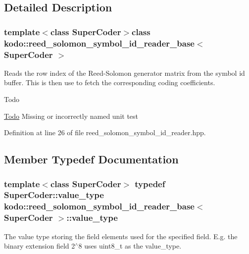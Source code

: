 \subsection{Detailed Description}
\subsubsection*{template$<$class Super\-Coder$>$class kodo\-::reed\-\_\-solomon\-\_\-symbol\-\_\-id\-\_\-reader\-\_\-base$<$ Super\-Coder $>$}

Reads the row index of the Reed-\/\-Solomon generator matrix from the symbol id buffer. This is then use to fetch the corresponding coding coefficients. 

\begin{DoxyRefDesc}{Todo}
\item[\hyperlink{todo__todo000045}{Todo}]Missing or incorrectly named unit test\end{DoxyRefDesc}


Definition at line 26 of file reed\-\_\-solomon\-\_\-symbol\-\_\-id\-\_\-reader.\-hpp.



\subsection{Member Typedef Documentation}
\hypertarget{classkodo_1_1reed__solomon__symbol__id__reader__base_aae5efe4cddfb83d9a895a95f44572d83}{
\subsubsection[{value\-\_\-type}]{\setlength{\rightskip}{0pt plus 5cm}template$<$class Super\-Coder$>$ typedef Super\-Coder\-::value\-\_\-type {\bf kodo\-::reed\-\_\-solomon\-\_\-symbol\-\_\-id\-\_\-reader\-\_\-base}$<$ Super\-Coder $>$\-::{\bf value\-\_\-type}}}\label{classkodo_1_1reed__solomon__symbol__id__reader__base_aae5efe4cddfb83d9a895a95f44572d83}




The value type storing the field elements used for the specified field. E.\-g. the binary extension field 2$^\wedge$8 uses uint8\-\_\-t as the value\-\_\-type. 

